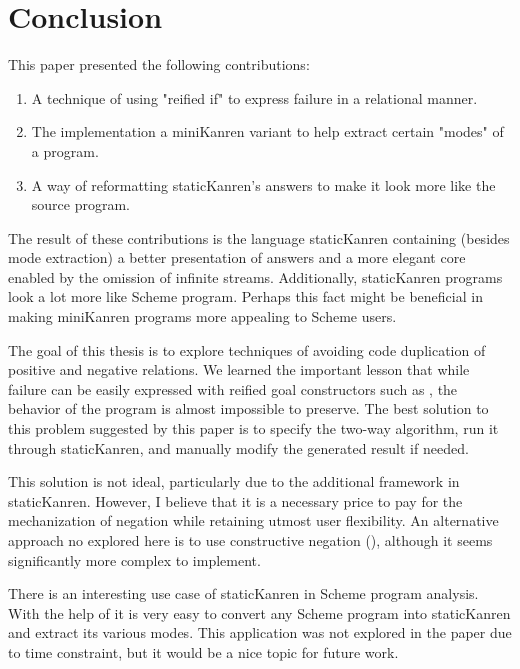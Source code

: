 \section{Conclusion}
\ifthesis
This paper presented the following contributions:
\begin{enumerate}
\item A technique of using "reified if" to express failure in a relational manner.
\item The implementation a miniKanren variant to help extract certain "modes" of a program.
\item A way of reformatting staticKanren's answers to make it look more like the source program.
\end{enumerate}
The result of these contributions is the language staticKanren containing (besides mode extraction) a better presentation of answers and a more elegant core enabled by the omission of infinite streams. Additionally, staticKanren programs look a lot more like Scheme program. Perhaps this fact might be beneficial in making miniKanren programs more appealing to Scheme users.

The goal of this thesis is to explore techniques of avoiding code duplication of positive and negative relations. We learned the important lesson that while failure can be easily expressed with reified goal constructors such as , the behavior of the program is almost impossible to preserve. The best solution to this problem suggested by this paper is to specify the two-way algorithm, run it through staticKanren, and manually modify the generated result if needed.

This solution is not ideal, particularly due to the additional framework in staticKanren. However, I believe that it is a necessary price to pay for the mechanization of negation while retaining utmost user flexibility. An alternative approach no explored here is to use constructive negation (\cite{chan}), although it seems significantly more complex to implement.

There is an interesting use case of staticKanren in Scheme program analysis. With the help of  it is very easy to convert any Scheme program into staticKanren and extract its various modes. This application was not explored in the paper due to time constraint, but it would be a nice topic for future work.
\else
\fi